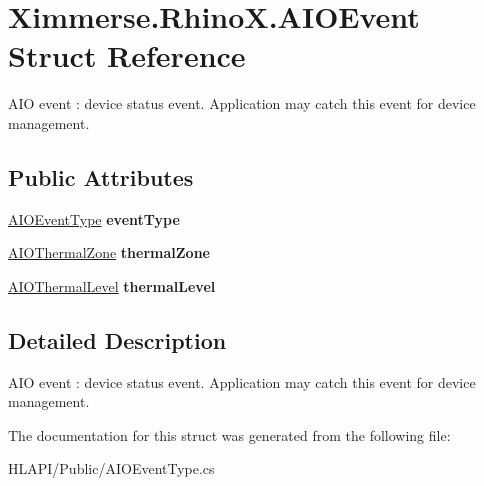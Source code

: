 \hypertarget{struct_ximmerse_1_1_rhino_x_1_1_a_i_o_event}{}\section{Ximmerse.\+Rhino\+X.\+A\+I\+O\+Event Struct Reference}
\label{struct_ximmerse_1_1_rhino_x_1_1_a_i_o_event}


A\+IO event \+: device status event. Application may catch this event for device management.  


\subsection*{Public Attributes}
\begin{DoxyCompactItemize}
\item 
\mbox{\label{struct_ximmerse_1_1_rhino_x_1_1_a_i_o_event_af54168c8c21a6278b180ba138076c2f6}} 
\mbox{\hyperlink{namespace_ximmerse_1_1_rhino_x_ab081ae2f0ca6ea05a0a1ab6143ba91a1}{A\+I\+O\+Event\+Type}} {\bfseries event\+Type}
\item 
\mbox{\label{struct_ximmerse_1_1_rhino_x_1_1_a_i_o_event_a16f428c48c8ef0cf798903dd8776ea7a}} 
\mbox{\hyperlink{namespace_ximmerse_1_1_rhino_x_a16299986ba040f9589ccf565ce232d75}{A\+I\+O\+Thermal\+Zone}} {\bfseries thermal\+Zone}
\item 
\mbox{\label{struct_ximmerse_1_1_rhino_x_1_1_a_i_o_event_a77d6188feefb8d6e2b28640cdc0a49cf}} 
\mbox{\hyperlink{namespace_ximmerse_1_1_rhino_x_a5dc681e0c88cfeddf5c073421b71b0a4}{A\+I\+O\+Thermal\+Level}} {\bfseries thermal\+Level}
\end{DoxyCompactItemize}


\subsection{Detailed Description}
A\+IO event \+: device status event. Application may catch this event for device management. 



The documentation for this struct was generated from the following file\+:\begin{DoxyCompactItemize}
\item 
H\+L\+A\+P\+I/\+Public/A\+I\+O\+Event\+Type.\+cs\end{DoxyCompactItemize}

